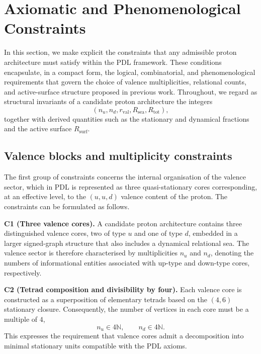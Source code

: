 \documentclass[11pt,a4paper]{article}
\begin{document}
\section{Axiomatic and Phenomenological Constraints}
\label{sec:constraints}

In this section, we make explicit the constraints that any admissible proton architecture must satisfy within the PDL framework. These conditions encapsulate, in a compact form, the logical, combinatorial, and phenomenological requirements that govern the choice of valence multiplicities, relational counts, and active-surface structure proposed in previous work.\cite{LaubscherIntroPDL2026,LaubscherPDLFull2026,LaubscherLDP2026,LaubscherDerivationAlpha2026} Throughout, we regard as structural invariants of a candidate proton architecture the integers
\begin{equation}
(n_u,n_d,r_{\mathrm{val}},R_{\mathrm{sea}},R_{\mathrm{tot}}),
\end{equation}
together with derived quantities such as the stationary and dynamical fractions and the active surface $R_{\mathrm{surf}}$.

\subsection{Valence blocks and multiplicity constraints}

The first group of constraints concerns the internal organisation of the valence sector, which in PDL is represented as three quasi-stationary cores corresponding, at an effective level, to the $(u,u,d)$ valence content of the proton.\cite{LaubscherPDLFull2026,LaubscherLDP2026} The constraints can be formulated as follows.

\medskip
\noindent\textbf{C1 (Three valence cores).} A candidate proton architecture contains three distinguished valence cores, two of type $u$ and one of type $d$, embedded in a larger signed-graph structure that also includes a dynamical relational sea. The valence sector is therefore characterised by multiplicities $n_u$ and $n_d$, denoting the numbers of informational entities associated with up-type and down-type cores, respectively.

\medskip
\noindent\textbf{C2 (Tetrad composition and divisibility by four).} Each valence core is constructed as a superposition of elementary tetrads based on the $(4,6)$ stationary closure. Consequently, the number of vertices in each core must be a multiple of $4$,
\begin{equation}
n_u \in 4\mathbb{N},\qquad n_d \in 4\mathbb{N}.
\end{equation}
This expresses the requirement that valence cores admit a decomposition into minimal stationary units compatible with the PDL axioms.\cite{LaubscherIntroPDL2026,LaubscherPDLFull2026}
\end{document}

